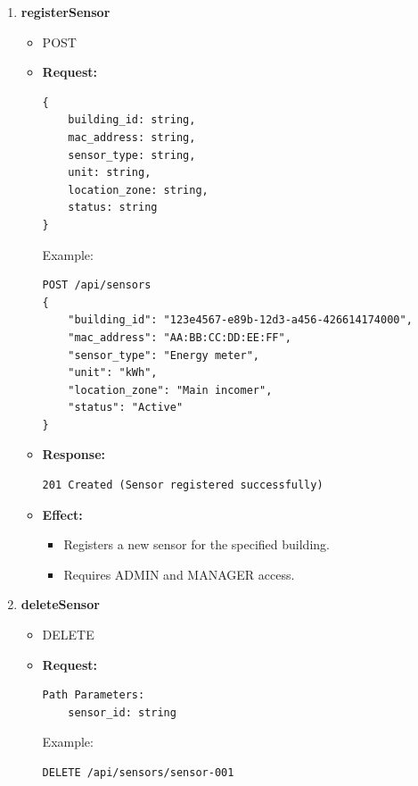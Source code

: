 \documentclass[12pt, a4paper]{article}
\begin{document}
\begin{enumerate}
\begin{itemize}
        \begin{itemize}
            \item Returns every sensor registered to the given building.
            \item Allowed for any authenticated user with access to the building.
        \end{itemize}
    \end{itemize}
    \item \textbf{registerSensor}
    \begin{itemize}
        \item POST 
        \item \textbf{Request:}
        \begin{verbatim}
{
    building_id: string,
    mac_address: string,
    sensor_type: string,
    unit: string,
    location_zone: string,
    status: string
}
        \end{verbatim}
        Example:
        \begin{verbatim}
POST /api/sensors
{
    "building_id": "123e4567-e89b-12d3-a456-426614174000",
    "mac_address": "AA:BB:CC:DD:EE:FF",
    "sensor_type": "Energy meter",
    "unit": "kWh",
    "location_zone": "Main incomer",
    "status": "Active"
}
        \end{verbatim}
        \item \textbf{Response:}
        \begin{verbatim}
201 Created (Sensor registered successfully)
        \end{verbatim}
        \item \textbf{Effect:}
        \begin{itemize}
            \item Registers a new sensor for the specified building. 
            \item Requires ADMIN and MANAGER access.
        \end{itemize}
    \end{itemize}
    \item \textbf{deleteSensor}
    \begin{itemize}
        \item DELETE
        \item \textbf{Request:}
        \begin{verbatim}
Path Parameters:
    sensor_id: string
        \end{verbatim}
        Example:
        \begin{verbatim}
DELETE /api/sensors/sensor-001
        \end{verbatim}

\end{itemize}
\end{enumerate}
\end{document}
